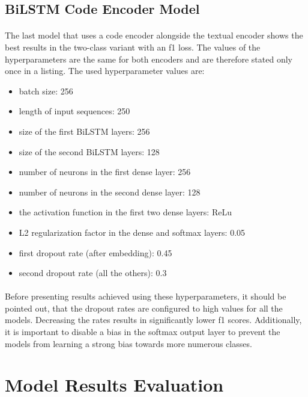 \subsection{BiLSTM Code Encoder Model}
\paragraph{}
The last model that uses a code encoder alongside the textual encoder shows the best results in the two-class variant with an f1 loss. The values of the hyperparameters are the same for both encoders and are therefore stated only once in a listing. The used hyperparameter values are:

\begin{itemize}
	\item batch size: 256
	\item length of input sequences: 250
	\item size of the first BiLSTM layers: 256
	\item size of the second BiLSTM layers: 128
	\item number of neurons in the first dense layer: 256
	\item number of neurons in the second dense layer: 128
	\item the activation function in the first two dense layers: ReLu
	\item L2 regularization factor in the dense and softmax layers: 0.05
	\item first dropout rate (after embedding): 0.45
	\item second dropout rate (all the others): 0.3
\end{itemize}

\paragraph{}
Before presenting results achieved using these hyperparameters, it should be pointed out, that the dropout rates are configured to high values for all the models. Decreasing the rates results in significantly lower f1 scores. Additionally, it is important to disable a bias in the softmax output layer to prevent the models from learning a strong bias towards more numerous classes.  

\section{Model Results Evaluation}
